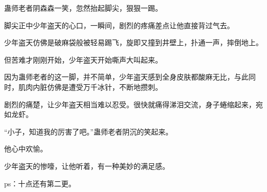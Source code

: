 \begin{this_body}
蛊师老者阴森森一笑，忽然抬起脚尖，狠狠一踢。

脚尖正中少年盗天的心口，一瞬间，剧烈的疼痛差点让他直接背过气去。

少年盗天仿佛是破麻袋般被轻易踢飞，旋即又撞到井壁上，扑通一声，摔倒地上。

但苦难才刚刚开始，少年盗天开始嘶声大叫起来。

因为蛊师老者的这一脚，并不简单，少年盗天感到全身皮肤都酸麻无比，与此同时，肌肉内脏仿佛是遭受万千冰针，不断地攒刺。

剧烈的痛楚，让少年盗天相当难以忍受。很快就痛得涕泪交流，身子蜷缩起来，宛如龙虾。

“小子，知道我的厉害了吧。”蛊师老者阴沉的笑起来。

他心中欢愉。

少年盗天的惨嚎，让他听着，有一种美妙的满足感。

ps：十点还有第二更。

\end{this_body}


